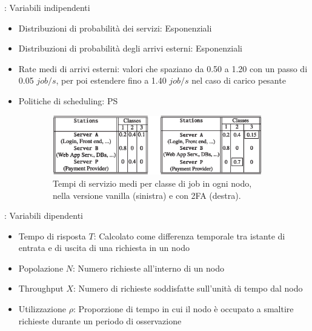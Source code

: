 \begin{frame}{\subsecname: Variabili indipendenti \citep{DBLP:books/sp/Serazzi24}}
\begin{itemize}
    \item Distribuzioni di probabilità dei servizi: Esponenziali
    \item Distribuzioni di probabilità degli arrivi esterni: Esponenziali
    \item Rate medi di arrivi esterni: valori che spaziano da 0.50 a 1.20 con un passo di 0.05 $job/s$, per poi estendere fino a 1.40 $job/s$ nel caso di carico pesante
    \item  Politiche di scheduling: PS
\end{itemize}

\begin{figure}
    \centering
    \begin{subfigure}{0.49\linewidth}
        \centering
        \includegraphics[width=1\linewidth]{figs/average_service_per_job_class_by_node.png}
        \caption{Tempi di servizio medi per classe di job in ogni nodo, nella versione vanilla (sinistra) e con 2FA (destra).}        
    \end{subfigure}
    \begin{subfigure}{0.49\linewidth}
        \centering
        
    \end{subfigure}
    \label{fig:enter-label}
\end{figure}

\end{frame}

\begin{frame}{\subsecname: Variabili dipendenti}
    \begin{itemize}
        \item Tempo di risposta $T$: Calcolato come differenza temporale tra istante di entrata e di uscita di una richiesta in un nodo
        \item Popolazione $N$: Numero richieste all'interno di un nodo
        \item Throughput $X$: Numero di richieste soddisfatte sull'unità di tempo dal nodo
        \item Utilizzazione $\rho$: Proporzione di tempo in cui il nodo è occupato a smaltire richieste durante un periodo di osservazione
    \end{itemize}
\end{frame}